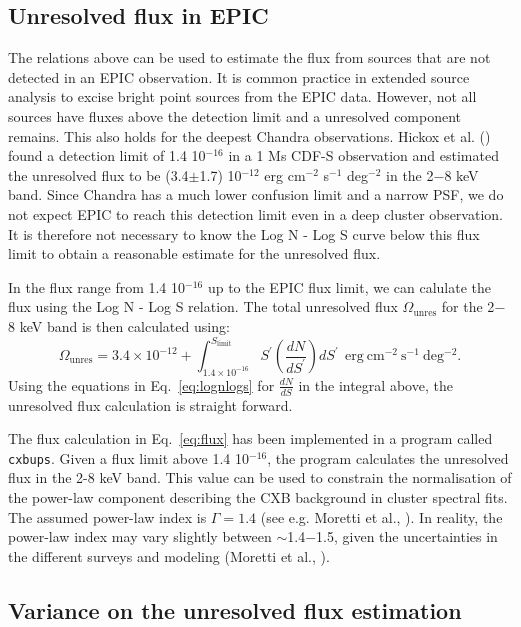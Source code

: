 \documentclass[10pt,a4paper]{article}
\begin{document}
\subsection{Unresolved flux in EPIC}

The relations above can be used to estimate the flux from sources that are not detected in an EPIC observation. It is common practice in extended source analysis to excise bright point sources from the EPIC data. However, not all sources have fluxes above the detection limit and a unresolved component remains. This also holds for the deepest Chandra observations. Hickox et al. (\cite{hickox2006}) found a detection limit of 1.4 10$^{-16}$ in a 1 Ms CDF-S observation and estimated the unresolved flux to be (3.4$\pm$1.7) 10$^{-12}$ erg cm$^{-2}$ s$^{-1}$ deg$^{-2}$ in the 2$-$8 keV band. Since Chandra has a much lower confusion limit and a narrow PSF, we do not expect EPIC to reach this detection limit even in a deep cluster observation. It is therefore not necessary to know the Log N - Log S curve below this flux limit to obtain a reasonable estimate for the unresolved flux.

In the flux range from 1.4 10$^{-16}$ up to the EPIC flux limit, we can calulate the flux using the Log N - Log S relation. The total unresolved flux $\Omega_{\mathrm{unres}}$ for the 2$-$8 keV band is then calculated using:
\begin{equation}
\Omega_{\mathrm{unres}} = 3.4 \times 10^{-12} + \int_{1.4 \times 10^{-16}}^{S_{\mathrm{limit}}} S^{\prime} \left(\frac{dN}{dS^{\prime}}\right) dS^{\prime} \mathrm{~~ erg~cm^{-2}~s^{-1}~deg^{-2}}.
\label{eq:flux}
\end{equation}
Using the equations in Eq.~\ref{eq:lognlogs} for $\frac{dN}{dS}$ in the integral above, the unresolved flux calculation is straight forward.

The flux calculation in Eq.~\ref{eq:flux} has been implemented in a program called \verb+cxbups+. Given a flux limit above 1.4 10$^{-16}$, the program calculates the unresolved flux in the 2-8 keV band. This value can be used to constrain the normalisation of the power-law component describing the CXB background in cluster spectral fits. The assumed power-law index is $\Gamma = 1.4$ (see e.g. Moretti et al., \cite{moretti2003}). In reality, the power-law index may vary slightly between $\sim$1.4$-$1.5, given the uncertainties in the different surveys and modeling (Moretti et al., \cite{moretti2009}).


\subsection{Variance on the unresolved flux estimation}
\end{document}
